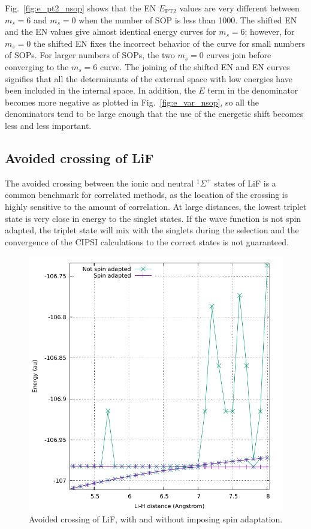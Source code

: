 \documentclass[aip,jcp,reprint,showkeys]{revtex4-1}
\newcommand{\sop}{SOP}
\newcommand{\cipsi}{CIPSI}
\newcommand{\ept}{E_\text{PT2}}
\begin{document}
Fig.~\ref{fig:e_pt2_nsop} shows that the EN $\ept$ values are very different
between $m_s=6$ and $m_s=0$ when the number of {\sop} is less than 1000. The
shifted EN and the EN values give almost identical energy curves for $m_s=6$;
however, for $m_s=0$ the shifted EN fixes the incorrect behavior of the curve
for small numbers of {\sop s}. For larger numbers of {\sop s}, the two $m_s=0$
curves join before converging to the $m_s=6$ curve. The joining of the shifted
EN and EN curves signifies that all the determinants of the external space with
low energies have been included in the internal space. In addition, the $E$
term in the denominator becomes more negative as plotted in
Fig.~\ref{fig:e_var_nsop}, so all the denominators tend to be large enough that
the use of the energetic shift becomes less and less important.


\subsection{Avoided crossing of LiF}

The avoided crossing between the ionic and neutral $^1\Sigma^+$ states of LiF is a 
common benchmark for correlated methods, as the location of the crossing is highly
sensitive to the amount of correlation. At large distances, the lowest triplet state
is very close in energy to the singlet states. If the wave function is not
spin adapted, the triplet state will mix with the singlets during the selection
and the convergence of the {\cipsi} calculations to the correct states is not guaranteed.

\begin{figure}
\includegraphics[width=0.9\columnwidth]{lif}
\caption{Avoided crossing of LiF, with and without imposing spin adaptation.}
\label{fig:lif}
\end{figure}
\end{document}
